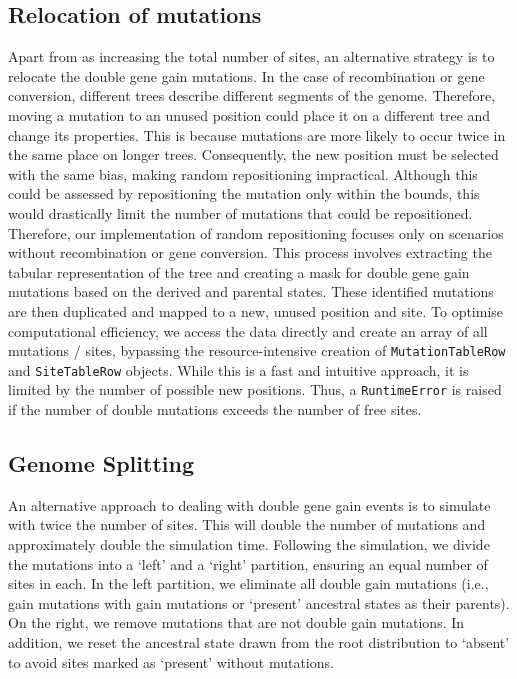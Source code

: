 \subsection{Relocation of mutations}
Apart from as increasing the total number of sites, an alternative strategy is to relocate the double gene gain mutations.
In the case of recombination or gene conversion, different trees describe different segments of the genome.
Therefore, moving a mutation to an unused position could place it on a different tree and change its properties.
This is because mutations are more likely to occur twice in the same place on longer trees.
Consequently, the new position must be selected with the same bias, making random repositioning impractical.
Although this could be assessed by repositioning the mutation only within the bounds, this would drastically limit the number of mutations that could be repositioned.
Therefore, our implementation of random repositioning focuses only on scenarios without recombination or gene conversion.
This process involves extracting the tabular representation of the tree and creating a mask for double gene gain mutations based on the derived and parental states.
These identified mutations are then duplicated and mapped to a new, unused position and site.
To optimise computational efficiency, we access the data directly and create an array of all mutations / sites,
bypassing the resource-intensive creation of \texttt{MutationTableRow} and \texttt{SiteTableRow} objects.
While this is a fast and intuitive approach, it is limited by the number of possible new positions.
Thus, a \texttt{RuntimeError} is raised if the number of double mutations exceeds the number of free sites.

\newpage
\subsection{Genome Splitting}
An alternative approach to dealing with double gene gain events is to simulate with twice the number of sites.
This will double the number of mutations and approximately double the simulation time.
Following the simulation, we divide the mutations into a `left' and a `right' partition, ensuring an equal number of sites in each.
In the left partition, we eliminate all double gain mutations (i.e., gain mutations with gain mutations or `present' ancestral states as their parents).
On the right, we remove mutations that are not double gain mutations.
In addition, we reset the ancestral state drawn from the root distribution to `absent' to avoid sites marked as `present' without mutations.

